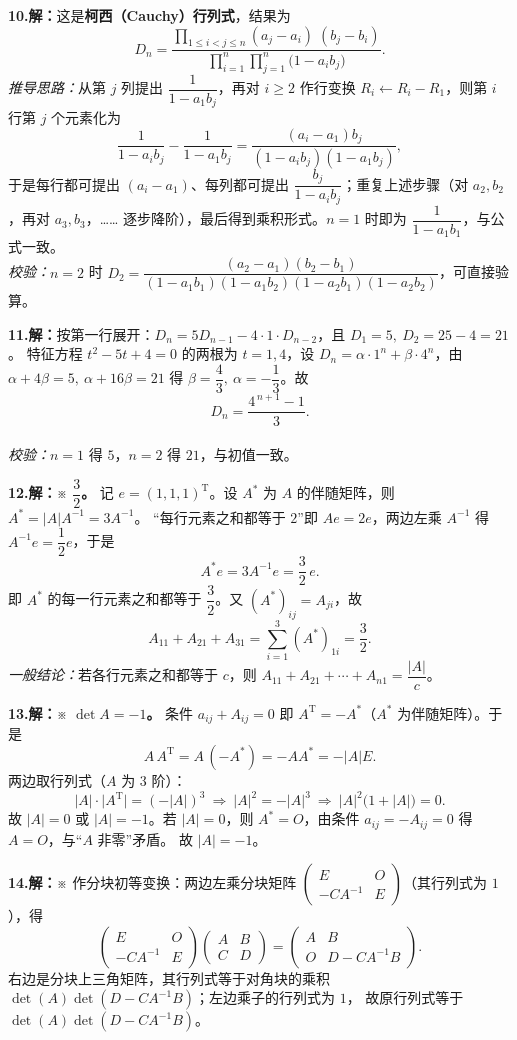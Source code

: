 ﻿\documentclass[11pt,a4paper,fontset=windows]{ctexart}
\newcommand{\sd}{\textbf{解：}}
\newcommand{\prob}[2]{\Needspace{5\baselineskip}\par\vspace{10pt}\noindent
  \textbf{#1}\hspace{0.4em}#2\par\vspace{3pt}}
\begin{document}
\prob{10.}{\sd 这是\textbf{柯西（Cauchy）行列式}，结果为
\[
D_n=\frac{\displaystyle\prod_{1\le i<j\le n}(a_j-a_i)\;(b_j-b_i)}
{\displaystyle\prod_{i=1}^{n}\prod_{j=1}^{n}\bigl(1-a_ib_j\bigr)} .
\]
\emph{推导思路：}从第 $j$ 列提出 $\dfrac{1}{1-a_1b_j}$，再对 $i\ge2$ 作行变换
$R_i\leftarrow R_i-R_1$，则第 $i$ 行第 $j$ 个元素化为
\[
\frac{1}{1-a_ib_j}-\frac{1}{1-a_1b_j}
=\frac{(a_i-a_1)b_j}{(1-a_ib_j)(1-a_1b_j)},
\]
于是每行都可提出 $(a_i-a_1)$、每列都可提出 $\dfrac{b_j}{1-a_ib_j}$；重复上述步骤（对 $a_2,b_2$，再对 $a_3,b_3$，……
逐步降阶），最后得到乘积形式。$n=1$ 时即为 $\dfrac{1}{1-a_1b_1}$，与公式一致。
\\[2pt]
\emph{校验：}$n=2$ 时 $D_2=\dfrac{(a_2-a_1)(b_2-b_1)}{(1-a_1b_1)(1-a_1b_2)(1-a_2b_1)(1-a_2b_2)}$，可直接验算。}

\prob{11.}{\sd 按第一行展开：$D_n=5D_{n-1}-4\cdot 1\cdot D_{n-2}$，且 $D_1=5,\ D_2=25-4=21$。
特征方程 $t^{2}-5t+4=0$ 的两根为 $t=1,4$，设 $D_n=\alpha\cdot1^{n}+\beta\cdot4^{n}$，由
$\alpha+4\beta=5,\ \alpha+16\beta=21$ 得 $\beta=\dfrac43,\ \alpha=-\dfrac13$。故
\[
D_n=\frac{4^{\,n+1}-1}{3}.
\]
\\[2pt]
\emph{校验：}$n=1$ 得 $5$，$n=2$ 得 $21$，与初值一致。}

\prob{12.}{\sd ※ \textbf{$\dfrac32$。}
记 $e=(1,1,1)^{\mathrm T}$。设 $A^{*}$ 为 $A$ 的伴随矩阵，则 $A^{*}=|A|A^{-1}=3A^{-1}$。
“每行元素之和都等于 $2$”即 $Ae=2e$，两边左乘 $A^{-1}$ 得 $A^{-1}e=\dfrac12 e$，于是
\[
A^{*}e=3A^{-1}e=\frac32\,e .
\]
即 $A^{*}$ 的每一行元素之和都等于 $\dfrac32$。又 $(A^{*})_{ij}=A_{ji}$，故
\[
A_{11}+A_{21}+A_{31}=\sum_{i=1}^{3}(A^{*})_{1i}=\frac32 .
\]
\emph{一般结论：}若各行元素之和都等于 $c$，则 $A_{11}+A_{21}+\cdots+A_{n1}=\dfrac{|A|}{c}$。}

\prob{13.}{\sd ※ \textbf{$\det A=-1$。}
条件 $a_{ij}+A_{ij}=0$ 即 $A^{\mathrm T}=-A^{*}$（$A^{*}$ 为伴随矩阵）。于是
\[
A\,A^{\mathrm T}=A\,(-A^{*})=-AA^{*}=-|A|E .
\]
两边取行列式（$A$ 为 3 阶）：
\[
|A|\cdot\bigl|A^{\mathrm T}\bigr|=(-|A|)^{3}\ \Longrightarrow\ |A|^{2}=-|A|^{3}
\ \Longrightarrow\ |A|^{2}\bigl(1+|A|\bigr)=0 .
\]
故 $|A|=0$ 或 $|A|=-1$。若 $|A|=0$，则 $A^{*}=O$，由条件 $a_{ij}=-A_{ij}=0$ 得 $A=O$，与“$A$ 非零”矛盾。
故 $|A|=-1$。}

\prob{14.}{\sd ※ 作分块初等变换：两边左乘分块矩阵
$\begin{pmatrix}E&O\\-CA^{-1}&E\end{pmatrix}$（其行列式为 $1$），得
\[
\begin{pmatrix}E&O\\-CA^{-1}&E\end{pmatrix}
\begin{pmatrix}A&B\\C&D\end{pmatrix}
=\begin{pmatrix}A&B\\O&D-CA^{-1}B\end{pmatrix}.
\]
右边是分块上三角矩阵，其行列式等于对角块的乘积 $\det(A)\det(D-CA^{-1}B)$；左边乘子的行列式为 $1$，
故原行列式等于 $\det(A)\det(D-CA^{-1}B)$。}
\end{document}
